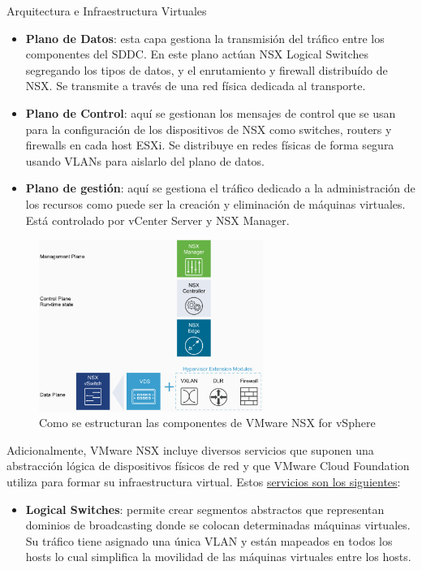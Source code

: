 \begin{subsection}{Arquitectura e Infraestructura Virtuales\cite{CFVirtInfraes}}
\begin{itemize}
    \item \textbf{Plano de Datos}: esta capa gestiona la transmisión del tráfico entre los componentes del SDDC. En este plano actúan NSX Logical Switches segregando los tipos de datos, y el enrutamiento y firewall distribuído de NSX. Se transmite a través de una red física dedicada al transporte.
    \item \textbf{Plano de Control}: aquí se gestionan los mensajes de control que se usan para la configuración de los dispositivos de NSX como switches, routers y firewalls en cada host ESXi. Se distribuye en redes físicas de forma segura usando VLANs para aislarlo del plano de datos.
    \item \textbf{Plano de gestión}: aquí se gestiona el tráfico dedicado a la administración de los recursos como puede ser la creación y eliminación de máquinas virtuales. Está controlado por vCenter Server y NSX Manager.
\end{itemize}
\begin{figure}[h!]
  \centering
  \includegraphics[width=0.65\textwidth]{imaxes/conceptosPrevios/planosNSX.png}
  \caption{Como se estructuran las componentes de VMware NSX for vSphere}
  \label{fig:planosNSX}
\end{figure}
\FloatBarrier
Adicionalmente, VMware NSX incluye diversos servicios que suponen una abstracción lógica de dispositivos físicos de red y que VMware Cloud Foundation utiliza para formar su infraestructura virtual. Estos \underline{servicios son los siguientes}\cite{componentesNSX,nsxCompDesign}:
\begin{itemize}
    \item \textbf{Logical Switches}: permite crear segmentos abstractos que representan dominios de broadcasting donde se colocan determinadas máquinas virtuales. Su tráfico tiene asignado una única VLAN y están mapeados en todos los hosts lo cual simplifica la movilidad de las máquinas virtuales entre los hosts.

\end{itemize}
\end{subsection}
